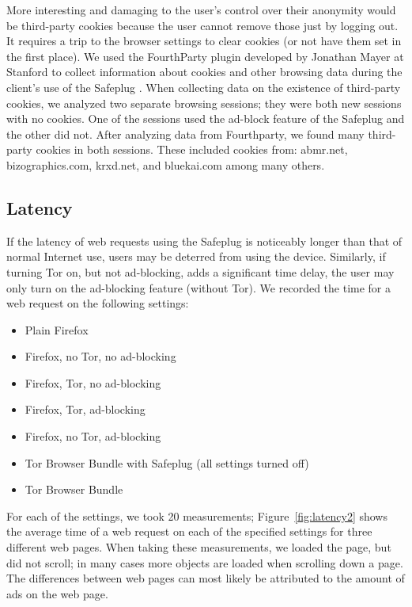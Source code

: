\documentclass[conference]{IEEEtran}
\begin{document}
More interesting and damaging to the user's control over their anonymity would be third-party cookies because the user cannot remove those just by logging out.  It requires a trip to the browser settings to clear cookies (or not have them set in the first place).  We used the FourthParty plugin developed by Jonathan Mayer at Stanford to collect information about cookies and other browsing data during the client's use of the Safeplug \cite{fourthparty}.  When collecting data on the existence of third-party cookies, we analyzed two separate browsing sessions; they were both new sessions with no cookies.  One of the sessions used the ad-block feature of the Safeplug and the other did not.  After analyzing data from Fourthparty, we found many third-party cookies in both sessions.  These included cookies from: abmr.net, bizographics.com, krxd.net, and bluekai.com among many others.

\subsection{Latency}
If the latency of web requests using the Safeplug is noticeably longer than that of normal Internet use, users may be deterred from using the device.  Similarly, if turning Tor on, but not ad-blocking, adds a significant time delay, the user may only turn on the ad-blocking feature (without Tor).  We recorded the time for a web request on the following settings:

\begin{itemize}
\item Plain Firefox
\item Firefox, no Tor, no ad-blocking
\item Firefox, Tor, no ad-blocking
\item Firefox, Tor, ad-blocking
\item Firefox, no Tor, ad-blocking
\item Tor Browser Bundle with Safeplug (all settings turned off)
\item Tor Browser Bundle
\end{itemize}

For each of the settings, we took 20 measurements; Figure~\ref{fig:latency2} shows the average time of a web request on each of the specified settings for three different web pages.  When taking these measurements, we loaded the page, but did not scroll; in many cases more objects are loaded when scrolling down a page.  The differences between web pages can most likely be attributed to the amount of ads on the web page.  
\end{document}
